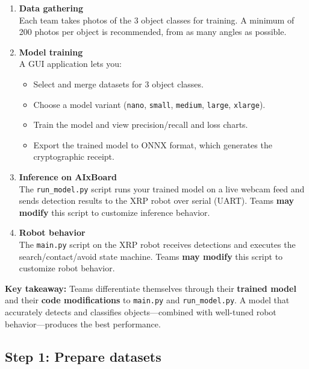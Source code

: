 \documentclass[a4]{article}
\begin{document}
\begin{enumerate}
    \item \textbf{Data gathering}\\
    Each team takes photos of the 3 object classes for training. A minimum of 200 photos per object is recommended, from as many angles as possible.

    \item \textbf{Model training}\\
    A GUI application lets you:
    \begin{itemize}
        \item Select and merge datasets for 3 object classes.
        \item Choose a model variant (\texttt{nano}, \texttt{small}, \texttt{medium}, \texttt{large}, \texttt{xlarge}).
        \item Train the model and view precision/recall and loss charts.
        \item Export the trained model to ONNX format, which generates the cryptographic receipt.
    \end{itemize}

    \item \textbf{Inference on AIxBoard}\\
    The \texttt{run\_model.py} script runs your trained model on a live webcam feed and sends detection results to the XRP robot over serial (UART). Teams \textbf{may modify} this script to customize inference behavior.

    \item \textbf{Robot behavior}\\
    The \texttt{main.py} script on the XRP robot receives detections and executes the search/contact/avoid state machine. Teams \textbf{may modify} this script to customize robot behavior.
\end{enumerate}

\begin{framed}
\textbf{Key takeaway:} Teams differentiate themselves through their \textbf{trained model} and their \textbf{code modifications} to \texttt{main.py} and \texttt{run\_model.py}. A model that accurately detects and classifies objects---combined with well-tuned robot behavior---produces the best performance.
\end{framed}

\subsection*{Step 1: Prepare datasets}
\end{document}
